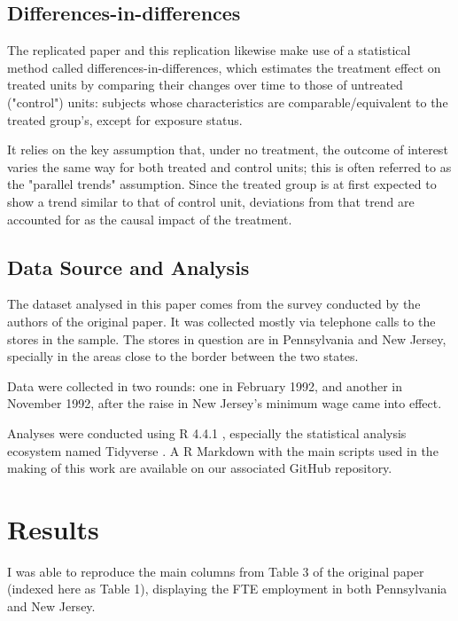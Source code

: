 \documentclass[11pt]{article}
\begin{document}
\subsection{Differences-in-differences}

    The replicated paper and this replication likewise make use of a statistical method called differences-in-differences, which estimates the treatment effect on treated units by comparing their changes over time to those of untreated ("control") units: subjects whose characteristics are comparable/equivalent to the treated group's, except for exposure status.

    It relies on the key assumption that, under no treatment, the outcome of interest varies the same way for both treated and control units; this is often referred to as the "parallel trends" assumption. Since the treated group is at first expected to show a trend similar to that of control unit, deviations from that trend are accounted for as the causal impact of the treatment.

\subsection{Data Source and Analysis}

    The dataset analysed in this paper comes from the survey conducted by the authors of the original paper. It was collected mostly via telephone calls to the stores in the sample. The  stores in question are in Pennsylvania and New Jersey, specially in the areas close to the border between the two states.

    Data were collected in two rounds: one in February 1992, and another in November 1992, after the raise in New Jersey's minimum wage came into effect.

    Analyses were conducted using R 4.4.1 \citep{R_lang}, especially the statistical analysis ecosystem named Tidyverse \citep{Tidyverse}. A R Markdown with the main scripts used in the making of this work are available on our associated GitHub repository.




\section{Results}
I was able to reproduce the main columns from Table 3 of the original paper (indexed here as Table 1), displaying the FTE employment in both Pennsylvania and New Jersey.
\end{document}
